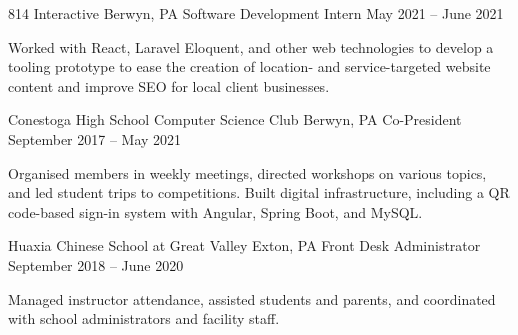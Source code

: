 \documentclass[letterpaper,11pt]{article}
\begin{document}
\begin{rsectionlist}


    \rsectionitem
      {814 Interactive}
      {Berwyn, PA}
      {Software Development Intern}
      {May 2021 -- June 2021}

      Worked with React, Laravel Eloquent, and other web technologies to develop a tooling prototype
      to ease the creation of location- and service-targeted website content and improve SEO for
      local client businesses.

    \rsectionitem
      {Conestoga High School Computer Science Club}
      {Berwyn, PA}
      {Co-President}
      {September 2017 -- May 2021}

      Organised members in weekly meetings, directed workshops on various topics, and led student
      trips to competitions. Built digital infrastructure, including a QR code-based sign-in system
      with Angular, Spring Boot, and MySQL.

    \rsectionitem
      {Huaxia Chinese School at Great Valley}
      {Exton, PA}
      {Front Desk Administrator}
      {September 2018 -- June 2020}

      Managed instructor attendance, assisted students and parents, and coordinated with school
      administrators and facility staff.
  \end{rsectionlist}




\end{document}
